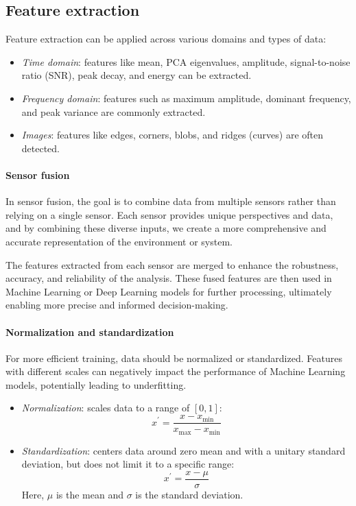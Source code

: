 \subsection{Feature extraction} 
Feature extraction can be applied across various domains and types of data:
\begin{itemize}
    \item \textit{Time domain}: features like mean, PCA eigenvalues, amplitude, signal-to-noise ratio (SNR), peak decay, and energy can be extracted.
    \item \textit{Frequency domain}: features such as maximum amplitude, dominant frequency, and peak variance are commonly extracted.
    \item \textit{Images}: features like edges, corners, blobs, and ridges (curves) are often detected.
\end{itemize}

\paragraph*{Sensor fusion}
In sensor fusion, the goal is to combine data from multiple sensors rather than relying on a single sensor. 
Each sensor provides unique perspectives and data, and by combining these diverse inputs, we create a more comprehensive and accurate representation of the environment or system.

The features extracted from each sensor are merged to enhance the robustness, accuracy, and reliability of the analysis. 
These fused features are then used in Machine Learning or Deep Learning models for further processing, ultimately enabling more precise and informed decision-making.

\paragraph*{Normalization and standardization}
For more efficient training, data should be normalized or standardized. 
Features with different scales can negatively impact the performance of Machine Learning models, potentially leading to underfitting.
\begin{itemize}
    \item \textit{Normalization}: scales data to a range of $[0,1]$:
        \[x^\prime=\dfrac{x-x_{\min}}{x_{\max}-x_{\min}}\]
    \item \textit{Standardization}: centers data around zero mean and with a unitary standard deviation, but does not limit it to a specific range:
        \[x^\prime=\dfrac{x-\mu}{\sigma}\]
        Here, $\mu$ is the mean and $\sigma$ is the standard deviation. 
\end{itemize}
